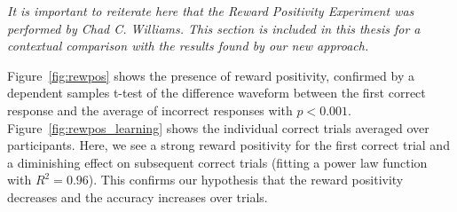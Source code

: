 \emph{It is important to reiterate here that the Reward Positivity Experiment 
was performed by Chad C. Williams. This section is included in this thesis for 
a contextual comparison with the results found by our new approach.}

Figure~\ref{fig:rewpos} shows the presence of reward positivity, confirmed by a 
dependent samples t-test of the difference waveform between the first correct 
response and the average of incorrect responses with $p < 0.001$.  
Figure~\ref{fig:rewpos_learning} shows the individual correct trials averaged 
over participants. Here, we see a strong reward positivity for the first 
correct trial and a diminishing effect on subsequent correct trials (fitting a 
power law function with $R^2 = 0.96$). This confirms our hypothesis that the 
reward positivity decreases and the \tvt accuracy increases over trials.
